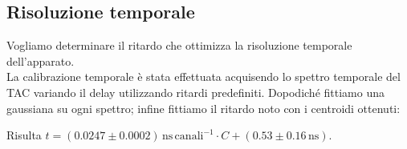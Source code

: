 \documentclass[a4paper,11pt,italian]{report}
\begin{document}
%
%
%
%
%
%
%
%
%


\subsection*{Risoluzione temporale}

Vogliamo determinare il ritardo che ottimizza la risoluzione temporale dell'apparato.\\

La calibrazione temporale è stata effettuata acquisendo lo spettro temporale del TAC variando il delay utilizzando ritardi predefiniti. Dopodiché fittiamo una gaussiana su ogni spettro; infine fittiamo il ritardo noto con i centroidi ottenuti:


Risulta $t = (0.0247 \pm 0.0002)\, \si{\nano\second}\,\mathrm{canali}^{-1} \cdot C + (0.53 \pm 0.16 \, \si{\nano\second})$.\\
\end{document}
